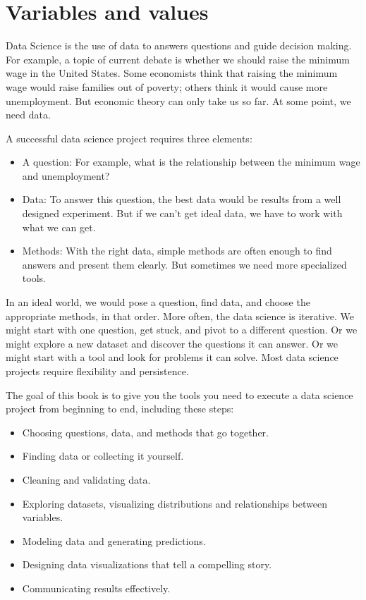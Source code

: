 \hypertarget{variables-and-values}{%
\chapter{Variables and values}\label{variables-and-values}}

Data Science is the use of data to answers questions and guide decision
making. For example, a topic of current debate is whether we should
raise the minimum wage in the United States. Some economists think that
raising the minimum wage would raise families out of poverty; others
think it would cause more unemployment. But economic theory can only
take us so far. At some point, we need data.

A successful data science project requires three elements:

\begin{itemize}
\item
  A question: For example, what is the relationship between the minimum
  wage and unemployment?
\item
  Data: To answer this question, the best data would be results from a
  well designed experiment. But if we can't get ideal data, we have to
  work with what we can get.
\item
  Methods: With the right data, simple methods are often enough to find
  answers and present them clearly. But sometimes we need more
  specialized tools.
\end{itemize}

In an ideal world, we would pose a question, find data, and choose the
appropriate methods, in that order. More often, the data science is
iterative. We might start with one question, get stuck, and pivot to a
different question. Or we might explore a new dataset and discover the
questions it can answer. Or we might start with a tool and look for
problems it can solve. Most data science projects require flexibility
and persistence.

The goal of this book is to give you the tools you need to execute a
data science project from beginning to end, including these steps:

\begin{itemize}
\item
  Choosing questions, data, and methods that go together.
\item
  Finding data or collecting it yourself.
\item
  Cleaning and validating data.
\item
  Exploring datasets, visualizing distributions and relationships
  between variables.
\item
  Modeling data and generating predictions.
\item
  Designing data visualizations that tell a compelling story.
\item
  Communicating results effectively.
\end{itemize}

